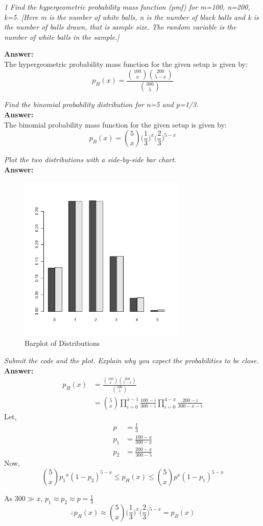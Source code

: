 \documentclass[12pt,letterpaper]{article}
\begin{document}
\textit{1}
\textit{Find the hypergeometric probability mass function (pmf) for m=100, n=200, k=5. [Here m is the number of white balls, n is the number of black balls and k is the number of balls drawn, that is sample size. The random variable is the number of white balls in the sample.]}

\textbf{Answer:}\\
The hypergeometric probability mass function for the given setup is given by:
$$p_H(x) = \frac{{100 \choose x}{200 \choose {5-x}}}{{300 \choose 5}}$$
\vspace{2em}

\textit{Find the binomial probability distribution for n=5 and p=1/3.}\\
\textbf{Answer:}\\
The binomial probability mass function for the given setup is given by:
$$p_B(x) = {5 \choose x}\biggl(\frac{1}{3}\biggr)^x\biggl(\frac{2}{3}\biggr)^{5-x}$$
\vspace{2em}

\textit{Plot the two distributions with a side-by-side bar chart.}\\
\textbf{Answer:}\\
\begin{figure}[h]
  \centering
  \includegraphics[width=8cm]{Barplot.png}
  \caption{Barplot of Distributions}
\end{figure}
\newpage
\textit{Submit the code and the plot. Explain why you expect the probabilities to be close.}\\
\textbf{Answer:}\\
\begin{align*}
  p_H(x) &= \frac{{100 \choose x}{200 \choose {5-x}}}{{300 \choose 5}}\\
  &= {5 \choose x} \prod_{i=0}^{x-1}\frac{100-i}{300-i}\prod_{i=0}^{4-x}\frac{200-i}{300-x-i} 
\end{align*}
Let,
\begin{align*}
  p &= \frac{1}{3}\\
  p_1 &= \frac{100-x}{300-x}\\
  p_2 &= \frac{200-x}{300-5}
\end{align*}
Now,
$${5 \choose x}{p_1}^x(1-p_2)^{5-x} \leq p_H(x) \leq {5 \choose x}{p}^x(1-p_1)^{5-x}$$

As $300 \gg x$, $p_1 \approx p_2 \approx p = \frac{1}{3}$
$$\therefore p_H(x) \approx {5 \choose x}\biggl(\frac{1}{3}\biggr)^x\biggl(\frac{2}{3}\biggr)^{5-x} = p_B(x)$$
\vspace{4em}

\end{document}
